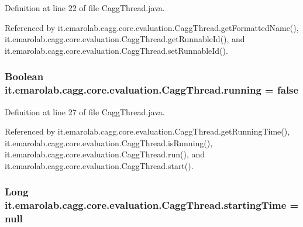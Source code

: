 Definition at line 22 of file Cagg\-Thread.\-java.



Referenced by it.\-emarolab.\-cagg.\-core.\-evaluation.\-Cagg\-Thread.\-get\-Formatted\-Name(), it.\-emarolab.\-cagg.\-core.\-evaluation.\-Cagg\-Thread.\-get\-Runnable\-Id(), and it.\-emarolab.\-cagg.\-core.\-evaluation.\-Cagg\-Thread.\-set\-Runnable\-Id().

\hypertarget{classit_1_1emarolab_1_1cagg_1_1core_1_1evaluation_1_1CaggThread_a8ebf5695b4282a63f70c666f6f9159cb}{
\subsubsection[{running}]{\setlength{\rightskip}{0pt plus 5cm}Boolean it.\-emarolab.\-cagg.\-core.\-evaluation.\-Cagg\-Thread.\-running = false\hspace{0.3cm}{\ttfamily [private]}}}\label{classit_1_1emarolab_1_1cagg_1_1core_1_1evaluation_1_1CaggThread_a8ebf5695b4282a63f70c666f6f9159cb}


Definition at line 27 of file Cagg\-Thread.\-java.



Referenced by it.\-emarolab.\-cagg.\-core.\-evaluation.\-Cagg\-Thread.\-get\-Running\-Time(), it.\-emarolab.\-cagg.\-core.\-evaluation.\-Cagg\-Thread.\-is\-Running(), it.\-emarolab.\-cagg.\-core.\-evaluation.\-Cagg\-Thread.\-run(), and it.\-emarolab.\-cagg.\-core.\-evaluation.\-Cagg\-Thread.\-start().

\hypertarget{classit_1_1emarolab_1_1cagg_1_1core_1_1evaluation_1_1CaggThread_af4ad33647a3b9e329340c246585fdc83}{
\subsubsection[{starting\-Time}]{\setlength{\rightskip}{0pt plus 5cm}Long it.\-emarolab.\-cagg.\-core.\-evaluation.\-Cagg\-Thread.\-starting\-Time = null\hspace{0.3cm}{\ttfamily [private]}}}\label{classit_1_1emarolab_1_1cagg_1_1core_1_1evaluation_1_1CaggThread_af4ad33647a3b9e329340c246585fdc83}


